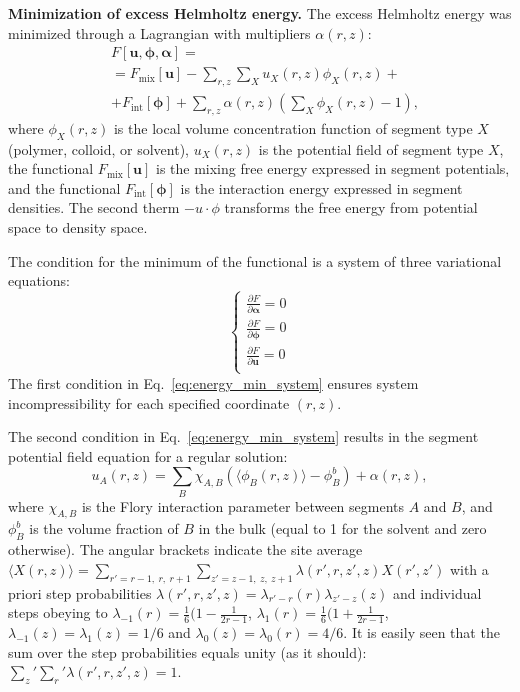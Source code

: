\documentclass[10pt, a4paper, twocolumn]{article}
\begin{document}
\bigskip\noindent
\textbf{Minimization of excess Helmholtz energy.}
The excess Helmholtz energy was minimized through a Lagrangian with multipliers $\alpha(r,z)$:
\begin{equation}
    \label{eq:fe_lagrangian}
    \begin{aligned}
        &F[\bm{u}, \boldsymbol{\phi}, \boldsymbol{\alpha}] =\\
        &= F_{\text{mix}}[\bm{u}] - \sum\limits_{r,z} \sum\limits_X u_X(r, z) \phi_X(r, z) + \\
        &+ F_{\text{int}} [\boldsymbol{\phi}] 
        + \sum\limits_{r,z} \alpha(r, z) \left( \sum\limits_X \phi_X(r, z) - 1 \right),
    \end{aligned} 
\end{equation}
where $\phi_X(r,z)$ is the local volume concentration function of segment type $X$ (polymer, colloid, or solvent), $u_X(r, z)$ is the potential field of segment type $X$, the functional $F_{\text{mix}}[\bm{u}]$ is the mixing free energy expressed in segment potentials, and the functional $F_{\text{int}} [\boldsymbol{\phi}]$ is the interaction energy expressed in  segment densities.
The second therm $- u\cdot \phi$ transforms the free energy from potential space to density space.

The condition for the minimum of the functional is a system of three variational equations:
\begin{equation}
    \label{eq:energy_min_system}
    \begin{cases}
        \frac{\partial F}{\partial \boldsymbol{\alpha}} = 0 \\
        \frac{\partial F}{\partial \boldsymbol{\phi}} = 0 \\
        \frac{\partial F}{\partial \bm{u}} = 0 \\
    \end{cases}
\end{equation}
The first condition in Eq.~\eqref{eq:energy_min_system} ensures system incompressibility for each specified coordinate $(r,z)$.

The second condition in Eq.~\eqref{eq:energy_min_system} results in the segment potential field equation for a regular solution:
\begin{equation}
    \label{eq:u-phi}
    u_A(r, z) =\sum\limits_{B} \chi_{A,B} \left(\langle \phi_B(r,z)\rangle - \phi_B^b \right) + \alpha(r, z),
\end{equation}
where $\chi_{A,B}$ is the Flory interaction parameter between segments $A$ and $B$, and $\phi_B^b$ is the volume fraction of $B$ in the bulk (equal to 1 for the solvent and zero otherwise).
The angular brackets indicate the site average $\langle X(r,z)\rangle = \sum_{r'=r-1,\ r,\ r+1}\sum_{z'=z-1,\ z,\ z+1} \lambda(r',r,z',z) X(r',z')$ with a priori step probabilities $\lambda(r',r,z',z)=\lambda_{r'-r}(r) \lambda_{z'-z}(z) $ and individual steps obeying to $\lambda_{-1}(r)=\frac{1}{6}(1-\frac{1}{2r-1}$, $\lambda_1 (r)=\frac{1}{6}(1+\frac{1}{2r-1}$, $\lambda_{-1}(z)=\lambda_1(z)=1/6$ and $\lambda_0(z)=\lambda_0(r)=4/6$.
It is easily seen that the sum over the step probabilities equals unity (as it should): $\sum_z'\sum_r' \lambda(r',r,z',z) = 1$.
\end{document}
